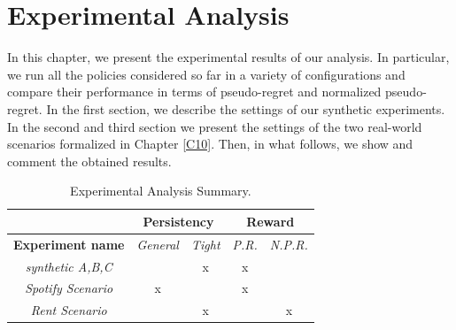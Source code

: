 \chapter{Experimental Analysis}\label{C11}

In this chapter, we present the experimental results of our analysis. In particular, we run all the policies considered so far in a variety of configurations and compare their performance in terms of pseudo-regret and normalized pseudo-regret. In the first section, we describe the settings of our synthetic experiments. In the second and third section we present the settings of the two real-world scenarios formalized in Chapter \ref{C10}. Then, in what follows, we show and comment the obtained results.


\begin{table}[h]
	\centering
	\caption{Experimental Analysis Summary.}
	\begin{tabular}{|c|c|c|c|c|} 
		\hhline{~----|}
		\multicolumn{1}{l|}{}     & \multicolumn{2}{c|}{{\cellcolor[rgb]{1,1,1}}\textbf{Persistency}}                               & \multicolumn{2}{c|}{{\cellcolor[rgb]{1,1,1}}\textbf{Reward}}                                 \\ 
		\hline
		\textbf{Experiment name}  & {\cellcolor[rgb]{1,1,1}}\textit{General} & {\cellcolor[rgb]{1,1,1}}\textit{Tight}   & {\cellcolor[rgb]{1,1,1}}\textit{P.R.} & {\cellcolor[rgb]{1,1,1}}\textit{N.P.R.}  \\ 
		\hline
		\textit{synthetic A,B,C}      & {\cellcolor[rgb]{1,1,1}}                 & {\cellcolor[rgb]{1,1,1}}x                               & {\cellcolor[rgb]{1,1,1}}x             & {\cellcolor[rgb]{1,1,1}}                 \\ 
		\hline
		\textit{Spotify Scenario} & {\cellcolor[rgb]{1,1,1}}x                & {\cellcolor[rgb]{1,1,1}}                                   & {\cellcolor[rgb]{1,1,1}}x             & {\cellcolor[rgb]{1,1,1}}                 \\ 
		\hline
		\textit{Rent Scenario}    & {\cellcolor[rgb]{1,1,1}}                 & {\cellcolor[rgb]{1,1,1}}x                                 & {\cellcolor[rgb]{1,1,1}}              & {\cellcolor[rgb]{1,1,1}}x                \\
		\hline
	\end{tabular}

\end{table}

